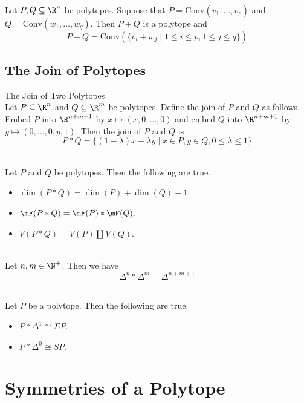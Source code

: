 \documentclass[a4paper]{article}
\begin{document}
\begin{prp}{}{}\\
Let $P,Q\subseteq\R^n$ be polytopes. Suppose that $P=\text{Conv}(v_1,\dots,v_p)$ and $Q=\text{Conv}(w_1,\dots,w_q)$. Then $P+Q$ is a polytope and $$P+Q=\text{Conv}\left(\{v_i+w_j\;|\;1\leq i\leq p,1\leq j\leq q\}\right)$$
\end{prp}

\subsection{The Join of Polytopes}
\begin{defn}{The Join of Two Polytopes}{}\\
Let $P\subseteq\R^n$ and $Q\subseteq\R^m$ be polytopes. Define the join of $P$ and $Q$ as follows. Embed $P$ into $\R^{n+m+1}$ by $x\mapsto(x,0,\dots,0)$ and embed $Q$ into $\R^{n+m+1}$ by $y\mapsto(0,\dots,0,y,1)$. Then the join of $P$ and $Q$ is $$P\ast Q=\{(1-\lambda)x+\lambda y\;|\;x\in P,y\in Q,0\leq\lambda\leq 1\}$$
\end{defn}

\begin{prp}{}{}\\
Let $P$ and $Q$ be polytopes. Then the following are true. 
\begin{itemize}
\item $\dim(P\ast Q)=\dim(P)+\dim(Q)+1$. 
\item $\mF(P\ast Q)=\mF(P)\ast\mF(Q)$. 
\item $V(P\ast Q)=V(P)\amalg V(Q)$. 
\end{itemize}
\end{prp}

\begin{eg}{}{}\\
Let $n,m\in\N^+$. Then we have $$\Delta^n\ast\Delta^m=\Delta^{n+m+1}$$
\end{eg}

\begin{eg}{}{}\\
Let $P$ be a polytope. Then the following are true. 
\begin{itemize}
\item $P\ast\Delta^1\cong\Sigma P$. 
\item $P\ast\Delta^0\cong SP$. 
\end{itemize}
\end{eg}

\pagebreak
\section{Symmetries of a Polytope}
\end{document}
